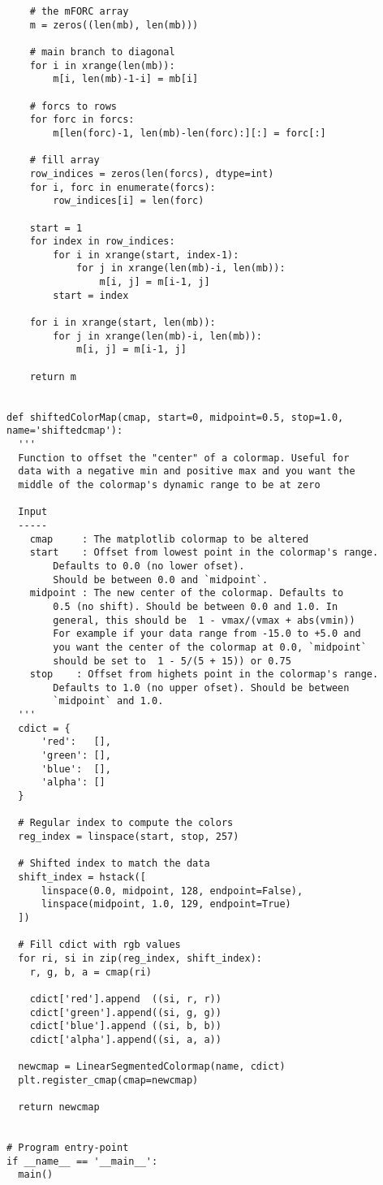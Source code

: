 \begin{lstlisting}
    # the mFORC array
    m = zeros((len(mb), len(mb)))

    # main branch to diagonal
    for i in xrange(len(mb)):
        m[i, len(mb)-1-i] = mb[i]

    # forcs to rows
    for forc in forcs:
        m[len(forc)-1, len(mb)-len(forc):][:] = forc[:]

    # fill array
    row_indices = zeros(len(forcs), dtype=int)
    for i, forc in enumerate(forcs):
        row_indices[i] = len(forc)

    start = 1
    for index in row_indices:
        for i in xrange(start, index-1):
            for j in xrange(len(mb)-i, len(mb)):
                m[i, j] = m[i-1, j]
        start = index

    for i in xrange(start, len(mb)):
        for j in xrange(len(mb)-i, len(mb)):
            m[i, j] = m[i-1, j]

    return m


def shiftedColorMap(cmap, start=0, midpoint=0.5, stop=1.0, name='shiftedcmap'):
  '''
  Function to offset the "center" of a colormap. Useful for
  data with a negative min and positive max and you want the
  middle of the colormap's dynamic range to be at zero

  Input
  -----
    cmap     : The matplotlib colormap to be altered
    start    : Offset from lowest point in the colormap's range.
        Defaults to 0.0 (no lower ofset).
        Should be between 0.0 and `midpoint`.
    midpoint : The new center of the colormap. Defaults to 
        0.5 (no shift). Should be between 0.0 and 1.0. In
        general, this should be  1 - vmax/(vmax + abs(vmin))
        For example if your data range from -15.0 to +5.0 and
        you want the center of the colormap at 0.0, `midpoint`
        should be set to  1 - 5/(5 + 15)) or 0.75
    stop    : Offset from highets point in the colormap's range.
        Defaults to 1.0 (no upper ofset). Should be between
        `midpoint` and 1.0.
  '''
  cdict = {
      'red':   [],
      'green': [],
      'blue':  [],
      'alpha': []
  }

  # Regular index to compute the colors
  reg_index = linspace(start, stop, 257)

  # Shifted index to match the data
  shift_index = hstack([
      linspace(0.0, midpoint, 128, endpoint=False), 
      linspace(midpoint, 1.0, 129, endpoint=True)
  ])

  # Fill cdict with rgb values
  for ri, si in zip(reg_index, shift_index):
    r, g, b, a = cmap(ri)

    cdict['red'].append  ((si, r, r))
    cdict['green'].append((si, g, g))
    cdict['blue'].append ((si, b, b))
    cdict['alpha'].append((si, a, a))

  newcmap = LinearSegmentedColormap(name, cdict)
  plt.register_cmap(cmap=newcmap)

  return newcmap


# Program entry-point
if __name__ == '__main__':
  main()

\end{lstlisting}
